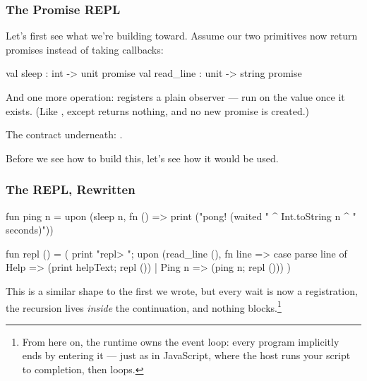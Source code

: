 \documentclass[aspectratio=169]{beamer}
\begin{document}
\begin{frame}[fragile]
  \frametitle{The Promise REPL}

  Let's first see what we're building toward. Assume our two primitives
  now return promises instead of taking callbacks:

  \begin{codeblock}
    val sleep     : int -> unit promise
    val read_line : unit -> string promise
\end{codeblock}

  \pause
  \vspace{\fill}

  And one more operation:  registers a plain
  observer --- run  on the value once it exists. (Like
  , except  returns nothing, and no new promise
  is created.)

  \pause
  \vspace{\fill}

  The contract underneath: .

  \pause
  \vspace{\fill}

  Before we see how to build this, let's see how it would be used.
\end{frame}

\begin{frame}[fragile]
  \frametitle{The REPL, Rewritten}

  {\small
  \begin{codeblock}
    fun ping n =
      upon (sleep n, fn () =>
        print ("pong! (waited " ^ Int.toString n ^ " seconds)"))

    fun repl () =
      ( print "repl> ";
        upon (read_line (), fn line =>
          case parse line of
            Help   => (print helpText; repl ())
          | Ping n => (ping n; repl ()))
      )
\end{codeblock}
  }

  \pause

  This is a similar shape to the first  we wrote, but every wait
  is now a registration, the recursion lives \textit{inside} the continuation,
  and nothing blocks.\footnote{From here on, the runtime owns the event
  loop: every program implicitly ends by entering it --- just as in
  JavaScript, where the host runs your script to completion, then loops.}
\end{frame}
\end{document}

